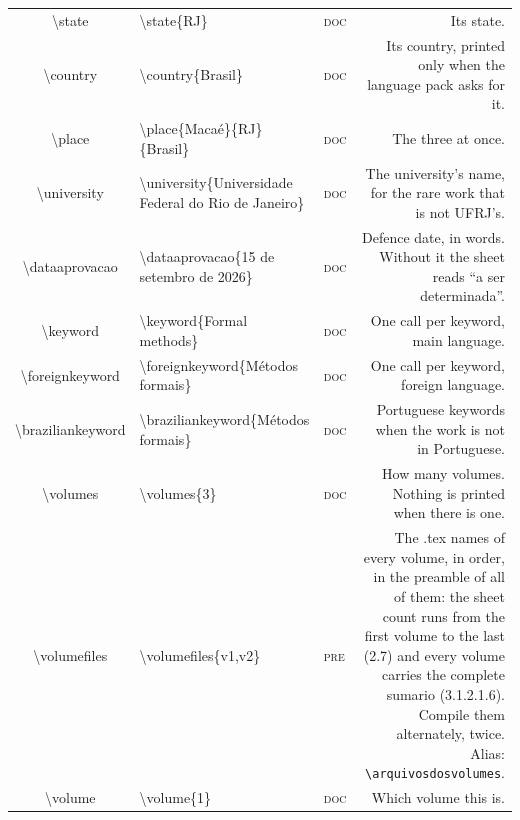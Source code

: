 \documentclass[a4paper,10pt]{article}
\newcommand\pre{\textsc{pre}}
\newcommand\doc{\textsc{doc}}
\begin{document}
\begin{longtable}{@{}CEWD@{}}
\textbackslash state & \textbackslash state\{RJ\} & \doc & Its state. \\
\textbackslash country & \textbackslash country\{Brasil\} & \doc & Its country, printed only when the language pack asks for it. \\
\textbackslash place & \textbackslash place\{Macaé\}\{RJ\}\{Brasil\} & \doc & The three at once. \\
\textbackslash university & \textbackslash university\{Universidade Federal do Rio de Janeiro\} & \doc & The university's name, for the rare work that is not UFRJ's. \\
\textbackslash dataaprovacao & \textbackslash dataaprovacao\{15 de setembro de 2026\} & \doc & Defence date, in words. Without it the sheet reads ``a ser determinada''. \\
\textbackslash keyword & \textbackslash keyword\{Formal methods\} & \doc & One call per keyword, main language. \\
\textbackslash foreignkeyword & \textbackslash foreignkeyword\{Métodos formais\} & \doc & One call per keyword, foreign language. \\
\textbackslash braziliankeyword & \textbackslash braziliankeyword\{Métodos formais\} & \doc & Portuguese keywords when the work is not in Portuguese. \\
\textbackslash volumes & \textbackslash volumes\{3\} & \doc & How many volumes. Nothing is printed when there is one. \\
\textbackslash volumefiles & \textbackslash volumefiles\{v1,v2\} & \pre & The .tex names of every volume, in order, in the preamble of all of them: the sheet count runs from the first volume to the last (2.7) and every volume carries the complete sumario (3.1.2.1.6). Compile them alternately, twice. Alias: \texttt{\textbackslash arquivosdosvolumes}. \\
\textbackslash volume & \textbackslash volume\{1\} & \doc & Which volume this is. \\
\midrule


\end{longtable}
\end{document}
